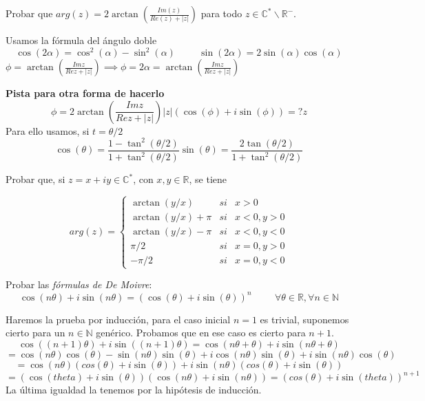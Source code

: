 \begin{ejer}
	Probar que $arg(z) = 2\arctan\left( \frac{Im(z)}{Re(z) + |z|} \right)$ para todo  $z\in\mathbb{C}^{\ast}\backslash\mathbb{R}^{-}$.
\end{ejer}

\begin{sol}

Usamos la fórmula del ángulo doble
$$ \cos(2\alpha) = \cos^2(\alpha)-\sin^2(\alpha) \hspace{1cm} \sin(2\alpha) = 2\sin(\alpha)\cos(\alpha) $$
$\phi = \arctan(\frac{Im z}{Re z + |z|}) \implies \phi = 2\alpha = \arctan(\frac{Im z}{Re z + |z|}) $

\textbf{Pista para otra forma de hacerlo}
$$ \phi = 2\arctan ( \frac{Im z}{Re z + |z|} ) 
|z|(\cos(\phi)+i\sin(\phi)) =? z $$
Para ello usamos, si $t=\theta/2$
$$ \cos(\theta) = \frac{1-\tan^2(\theta/2)}{1+\tan^2(\theta/2)}
\sin(\theta) = \frac{2\tan(\theta/2)}{1+\tan^2(\theta/2)} $$
\end{sol}


\begin{ejer}
	Probar que, si $z=x+iy\in\mathbb{C}^{\ast}$, con $x,y\in\mathbb{R}$, se tiene
	
	$$
	arg(z) = \left\{ 
		\begin{array}{lcc}
			\arctan(y/x) &   si  & x>0 \\
			\arctan(y/x) + \pi & si & x<0, y>0 \\
			\arctan(y/x)-\pi & si & x<0,y<0 \\
			\pi/2 & si & x=0,y>0 \\
			-\pi/2 & si & x=0,y<0 
		\end{array}
	\right.
	$$
\end{ejer}


\begin{ejer}
	Probar las \textit{fórmulas de De Moivre}:
	$$ \cos(n\theta) + i\sin(n\theta) = (\cos(\theta)+i\sin(\theta))^n \hspace{1cm}\forall\theta\in\mathbb{R}, \forall n\in\mathbb{N} $$
\end{ejer}


\begin{sol}
Haremos la prueba por inducción, para el caso inicial $n=1$ es trivial, suponemos cierto para un $n\in\mathbb{N}$ genérico.
Probamos que en ese caso es cierto para $n+1$.
$$ 
\cos((n+1)\theta)+i\sin((n+1)\theta) 
=
\cos(n\theta+\theta)+i\sin(n\theta+\theta)
$$
$$ =
\cos(n\theta) \cos(\theta)- \sin(n\theta)\sin(\theta) +i\cos(n\theta)\sin(\theta) + i\sin(n\theta)\cos(\theta) $$
$$ =
\cos(n\theta)(cos(\theta)+i\sin(\theta)) + i\sin(n\theta)(cos(\theta)+i\sin(\theta))
$$
$$=
(\cos(theta)+i\sin(\theta)) (\cos(n\theta)+i\sin(n\theta))
=
(cos(\theta)+i\sin(theta))^{n+1}
$$
La última igualdad la tenemos por la hipótesis de inducción.
\end{sol}



